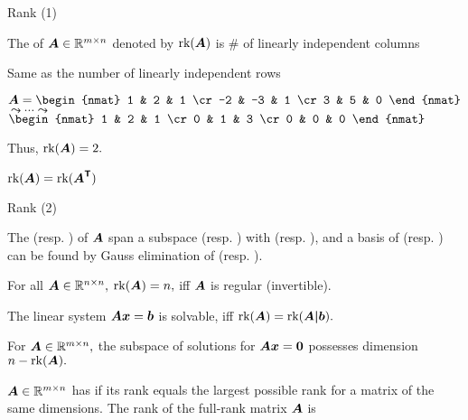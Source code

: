 \documentclass[fleqn,aspectratio=169]{beamer}
\begin{document}
\begin{frame}{Rank (1)}

\plitemsep 0.15in

\bci 
\item {} The   of $\bm{A} \in {\mathbb R}^{m \times n}$ denoted by $\text{rk}(\bm{A})$ is \# of linearly independent columns 
\bci
\item Same as the number of linearly independent rows
\eci

\item $\mat{A} = 
\begin{nmat}
1 & 2 & 1 \cr
-2 & -3 & 1 \cr
3 & 5 & 0 
\end{nmat}$
$\leadsto \cdots \leadsto$
$\begin{nmat}
1 & 2 & 1 \cr
0 & 1 & 3 \cr
0 & 0 & 0 
\end{nmat}$

\bigskip
Thus, $\text{rk}(\bm{A})=2.$

\item $\text{rk}(\bm{A}) = \text{rk}(\bm{{\bm{A}}^{\mathsf{T}}})$
\eci

\end{frame}

\begin{frame}{Rank (2)}

\plitemsep 0.2in

\bci 

\item The  (resp. ) of $\bm{A}$ span a subspace  (resp. ) with   (resp. ), and 
a basis of  (resp. ) can be found by Gauss elimination of  (resp. ).

\item For all $\bm{A} \in {\mathbb R}^{n \times n},$ $\text{rk}(\bm{A}) =n,$ iff $\bm{A}$ is regular (invertible). 

\item The linear system $\bm{A} \bm{x} = \bm{b}$ is solvable, iff $\text{rk}(\bm{A}) = \text{rk}(\bm{A|b}).$

\item For $\bm{A} \in {\mathbb R}^{m \times n},$ the subspace of solutions for $\bm{A} \bm{x} = \bm{0}$ possesses dimension $n - \text{rk}(\bm{A}).$

\item $\bm{A} \in {\mathbb R}^{m \times n}$ has  if its rank equals the largest possible rank for a matrix of the same dimensions. The rank of the full-rank matrix $\bm{A}$ is 

\eci

\end{frame}
\end{document}
